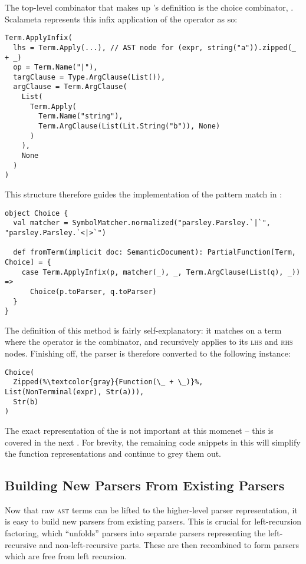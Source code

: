 \documentclass[../../main.tex]{subfiles}
\begin{document}
The top-level combinator that makes up 's definition is the choice combinator, \scala{|}.
Scalameta represents this infix application of the \scala{|} operator as so:
\begin{verbatim}
Term.ApplyInfix(
  lhs = Term.Apply(...), // AST node for (expr, string("a")).zipped(_ + _)
  op = Term.Name("|"),
  targClause = Type.ArgClause(List()),
  argClause = Term.ArgClause(
    List(
      Term.Apply(
        Term.Name("string"),
        Term.ArgClause(List(Lit.String("b")), None)
      )
    ),
    None
  )
)
\end{verbatim}
%
This structure therefore guides the implementation of the pattern match in :
\begin{verbatim}
object Choice {
  val matcher = SymbolMatcher.normalized("parsley.Parsley.`|`", "parsley.Parsley.`<|>`")

  def fromTerm(implicit doc: SemanticDocument): PartialFunction[Term, Choice] = {
    case Term.ApplyInfix(p, matcher(_), _, Term.ArgClause(List(q), _)) =>
      Choice(p.toParser, q.toParser)
  }
}
\end{verbatim}
%
The definition of this method is fairly self-explanatory: it matches on a  term where the operator is the \scala{|} combinator, and recursively applies  to its \textsc{lhs} and \textsc{rhs} nodes.
Finishing off, the  parser is therefore converted to the following  instance:
\begin{verbatim}
Choice(
  Zipped(%\textcolor{gray}{Function(\_ + \_)}%, List(NonTerminal(expr), Str(a))),
  Str(b)
)
\end{verbatim}
The exact representation of the  is not important at this momenet -- this is covered in the next .
For brevity, the remaining code snippets in this  will simplify the function representations and continue to grey them out.

\subsection{Building New Parsers From Existing Parsers}
Now that raw \textsc{ast} terms can be lifted to the higher-level parser representation, it is easy to build new parsers from existing parsers.
This is crucial for left-recursion factoring, which ``unfolds'' parsers into separate parsers representing the left-recursive and non-left-recursive parts.
These are then recombined to form parsers which are free from left recursion.
\end{document}

